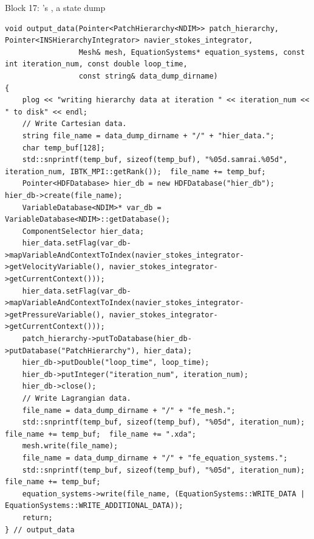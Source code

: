 \documentclass[aspectratio=169,11pt]{beamer}
\begin{document}
\begin{frame}[fragile]{Block 17: 's , a state dump}
\label{fr:outputdata}
\begin{lstlisting}[style=cppmicro]
void output_data(Pointer<PatchHierarchy<NDIM>> patch_hierarchy, Pointer<INSHierarchyIntegrator> navier_stokes_integrator,
                 Mesh& mesh, EquationSystems* equation_systems, const int iteration_num, const double loop_time,
                 const string& data_dump_dirname)
{
    plog << "writing hierarchy data at iteration " << iteration_num << " to disk" << endl;
    // Write Cartesian data.
    string file_name = data_dump_dirname + "/" + "hier_data.";
    char temp_buf[128];
    std::snprintf(temp_buf, sizeof(temp_buf), "%05d.samrai.%05d", iteration_num, IBTK_MPI::getRank());  file_name += temp_buf;
    Pointer<HDFDatabase> hier_db = new HDFDatabase("hier_db");  hier_db->create(file_name);
    VariableDatabase<NDIM>* var_db = VariableDatabase<NDIM>::getDatabase();
    ComponentSelector hier_data;
    hier_data.setFlag(var_db->mapVariableAndContextToIndex(navier_stokes_integrator->getVelocityVariable(), navier_stokes_integrator->getCurrentContext()));
    hier_data.setFlag(var_db->mapVariableAndContextToIndex(navier_stokes_integrator->getPressureVariable(), navier_stokes_integrator->getCurrentContext()));
    patch_hierarchy->putToDatabase(hier_db->putDatabase("PatchHierarchy"), hier_data);
    hier_db->putDouble("loop_time", loop_time);
    hier_db->putInteger("iteration_num", iteration_num);
    hier_db->close();
    // Write Lagrangian data.
    file_name = data_dump_dirname + "/" + "fe_mesh.";
    std::snprintf(temp_buf, sizeof(temp_buf), "%05d", iteration_num);  file_name += temp_buf;  file_name += ".xda";
    mesh.write(file_name);
    file_name = data_dump_dirname + "/" + "fe_equation_systems.";
    std::snprintf(temp_buf, sizeof(temp_buf), "%05d", iteration_num);  file_name += temp_buf;
    equation_systems->write(file_name, (EquationSystems::WRITE_DATA | EquationSystems::WRITE_ADDITIONAL_DATA));
    return;
} // output_data
\end{lstlisting}
\end{frame}
\end{document}
